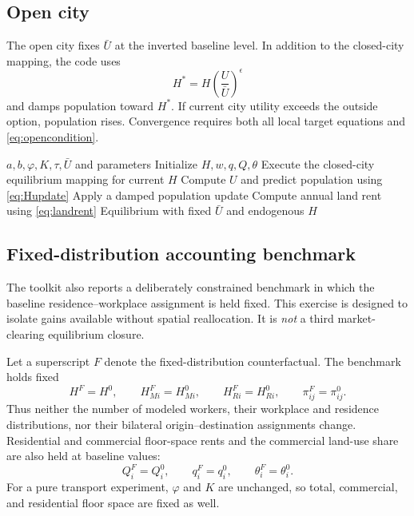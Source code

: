 \documentclass[11pt,a4paper]{article}
\begin{document}
\subsection{Open city}
The open city fixes $\bar U$ at the inverted baseline level. In addition to the
closed-city mapping, the code uses
\begin{equation}
 H^{*}=H\left(\frac{U}{\bar U}\right)^\epsilon              \label{eq:Hupdate}
\end{equation}
and damps population toward $H^*$. If current city utility exceeds the outside
option, population rises. Convergence requires both all local target equations
and \eqref{eq:opencondition}.

\begin{algorithm}[ht]
\caption{Open-city equilibrium}
\begin{algorithmic}[1]
\Require $a,b,\varphi,K,\tau,\bar U$ and parameters
\State Initialize $H,w,q,Q,\theta$
 \State Execute the closed-city equilibrium mapping for current $H$
 \State Compute $U$ and predict population using \eqref{eq:Hupdate}
 \State Apply a damped population update
\EndWhile
\State Compute annual land rent using \eqref{eq:landrent}
\Ensure Equilibrium with fixed $\bar U$ and endogenous $H$
\end{algorithmic}
\end{algorithm}

\subsection{Fixed-distribution accounting benchmark}
\label{sec:fixeddistribution}
The toolkit also reports a deliberately constrained benchmark in which the
baseline residence--workplace assignment is held fixed. This exercise is
designed to isolate gains available without spatial reallocation. It is
\emph{not} a third market-clearing equilibrium closure.

Let a superscript $F$ denote the fixed-distribution counterfactual. The
benchmark holds fixed
\begin{equation}
 H^F=H^0,\qquad H_{Mi}^F=H_{Mi}^0,\qquad H_{Ri}^F=H_{Ri}^0,
 \qquad \pi_{ij}^F=\pi_{ij}^0.                         \label{eq:fixedmargins}
\end{equation}
Thus neither the number of modeled workers, their workplace and residence
distributions, nor their bilateral origin--destination assignments change.
Residential and commercial floor-space rents and the commercial land-use share
are also held at baseline values:
\begin{equation}
 Q_i^F=Q_i^0,\qquad q_i^F=q_i^0,\qquad \theta_i^F=\theta_i^0. \label{eq:fixedprices}
\end{equation}
For a pure transport experiment, $\varphi$ and $K$ are unchanged, so total,
commercial, and residential floor space are fixed as well.
\end{document}
